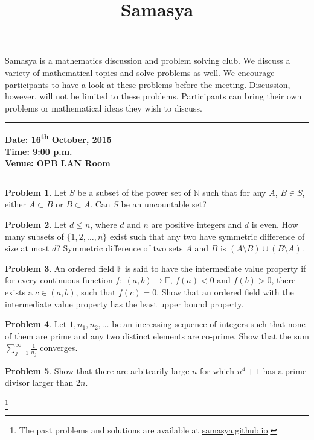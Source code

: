 \documentclass[10pt,a4paper,notitlepage]{article}
\title{\textrm{\textbf{\fontsize{30}{40}\selectfont Samasya}}}
\date{%
    }
\theoremstyle{definition}
\newtheorem{prob}{Problem}
\newcommand\blfootnote[1]{%
  \begingroup
  \renewcommand\thefootnote{}\footnote{#1}%
  \addtocounter{footnote}{-1}%
  \endgroup
}
\begin{document}
\maketitle

Samasya is a mathematics discussion and problem solving club.
We discuss a variety of mathematical topics and solve problems as well.
We encourage participants to have a look at these problems%
before the meeting.
Discussion, however, will not be limited to these problems.
Participants can bring their own problems or mathematical ideas they wish to discuss.\\
\hrule

\textbf{Date: 16\textsuperscript{th} October, 2015}%
\\
\textbf{Time: 9:00 p.m.}%
\\
\textbf{Venue: OPB LAN Room}%
\\
\hrule


\begin{prob}
Let $S$ be a subset of the power set of $\mathbb{N}$ such that for any $A$, $B \in S$, either $A \subset B$ or $B \subset A$. Can $S$ be an uncountable set?
\end{prob}

\begin{prob}
Let $d \leq n$, where $d$ and $n$ are positive integers and $d$ is even. How many subsets of $\{1, 2, \ldots, n\}$ exist such that any two have symmetric difference of size at most $d$? Symmetric difference of two sets $A$ and $B$ is $(A \setminus B) \cup (B \setminus A)$.
\end{prob}

\begin{prob}
An ordered field $\mathbb{F}$ is said to have the intermediate value property if for every continuous function $f:\ (a,b) \mapsto \mathbb{F}$, $f(a)<0$ and $f(b)>0$, there exists a $c \in (a,b)$, such that $f(c)=0$. Show that an ordered field with the intermediate value property has the least upper bound property.
\end{prob}

\begin{prob}
Let $1, n_1, n_2, \ldots$ be an increasing sequence of integers such that none of them are prime and any two distinct elements are co-prime. Show that the sum $\sum_{j=1}^\infty \frac{1}{n_j}$ converges. 
\end{prob}

\begin{prob}
Show that there are arbitrarily large $n$ for which $n^4+1$ has a prime divisor larger than $2n$.
\end{prob}

\blfootnote{The past problems and solutions are available at \href{http://samasya.github.io}{samasya.github.io}.}
\end{document}
